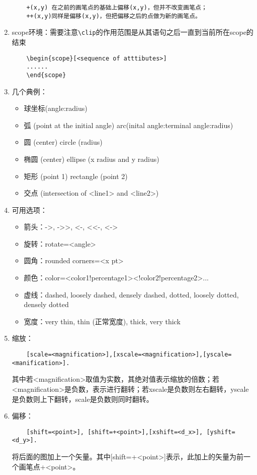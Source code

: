 \begin{enumerate}
\begin{lstlisting}
	+(x,y) 在之前的画笔点的基础上偏移(x,y)，但并不改变画笔点；
	++(x,y)同样是偏移(x,y)，但把偏移之后的点做为新的画笔点。
	\end{lstlisting}
	\item scope环境：需要注意\lstinline|\clip|的作用范围是从其语句之后一直到当前所在scope的结束
	\begin{lstlisting}
	\begin{scope}[<sequence of atttibutes>]
	......
	\end{scope}
	\end{lstlisting}
	\item 几个典例：
	\begin{itemize}
		\item 球坐标(angle:radius)
		\item 弧 (point at the initial angle) arc(inital angle:terminal angle:radius)
		\item 圆 (center) circle (radius)
		\item 椭圆 (center) ellipse (x radius and y radius)
		\item 矩形 (point 1) rectangle (point 2)
		\item 交点 (intersection of <line1> and <line2>)
	\end{itemize}
	\item 可用选项：
	\begin{itemize}
		\item 箭头：->, ->>, <-, <<-, <->
		\item 旋转：rotate=<angle>
		\item 圆角：rounded corners=<x pt>
		\item 颜色：color=<color1!percentage1><!color2!percentage2>...
		\item 虚线：dashed, loosely dashed, densely dashed, dotted, loosely dotted, densely dotted
		\item 宽度：very thin, thin (正常宽度), thick, very thick
	\end{itemize}
	\item 缩放：
	\begin{lstlisting}
	[scale=<magnification>],[xscale=<magnification>],[yscale=<manification>].
	\end{lstlisting}
	其中若<magnification>取值为实数，其绝对值表示缩放的倍数；若<magnification>是负数，表示进行翻转；若xscale是负数则左右翻转，yscale是负数则上下翻转，scale是负数则同时翻转。
	\item 偏移：
	\begin{lstlisting}
	[shift=<point>], [shift=+<point>],[xshift=<d_x>], [yshift=<d_y>].
	\end{lstlisting}
	将后面的图加上一个矢量。其中[shift=+<point>]表示，此加上的矢量为前一个画笔点+<point>。
\end{enumerate}